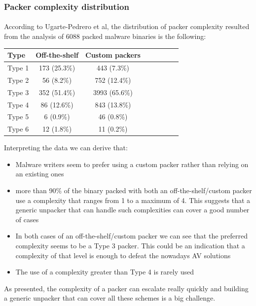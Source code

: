 \subsubsection{Packer complexity distribution}
\paragraph{}
According to Ugarte-Pedrero et al\cite{sokpacker}, the distribution of packer complexity resulted from the analysis of 6088 packed malware binaries is the following:

\begin{table}[H]
\begin{center}
\begin{tabular}{l*{6}{c}r}
Type      & Off-the-shelf & Custom packers \\
\hline
Type 1 &       173 (25.3\%) & 443 (7.3\%) \\
Type 2 &       56 (8.2\%) & 752 (12.4\%) \\
Type 3 &       352 (51.4\%)  & 3993 (65.6\%) \\
Type 4 &       86 (12.6\%) & 843 (13.8\%) \\
Type 5 &       6 (0.9\%)  & 46 (0.8\%) \\
Type 6 &       12 (1.8\%) & 11 (0.2\%) \\
\end{tabular}
\end{center}
\end{table}

Interpreting the data we can derive that:
\begin{itemize}
\item Malware writers seem to prefer using a custom packer rather than relying on an existing ones
\item more than 90\% of the binary packed with both an off-the-shelf/custom packer use a complexity that ranges from 1 to a maximum of 4. This suggests that a generic unpacker that can handle such complexities can cover a good number of cases
\item In both cases of an off-the-shelf/custom packer we can see that the preferred complexity seems to be a Type 3 packer. This could be an indication that a complexity of that level is enough to defeat the nowadays \ac{AV} solutions
\item The use of a complexity greater than Type 4 is rarely used
\end{itemize}
As presented, the complexity of a packer can escalate really quickly and building a generic unpacker that can cover all these schemes is a big challenge.

